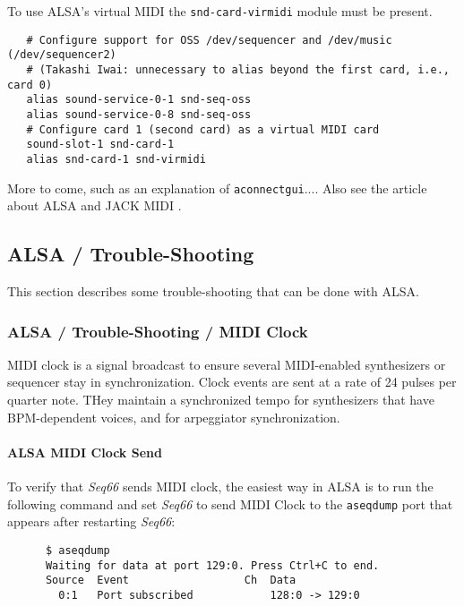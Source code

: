    To use ALSA's virtual MIDI the
   \texttt{snd-card-virmidi} module must be present. 

   \begin{verbatim}
   # Configure support for OSS /dev/sequencer and /dev/music (/dev/sequencer2)
   # (Takashi Iwai: unnecessary to alias beyond the first card, i.e., card 0)
   alias sound-service-0-1 snd-seq-oss
   alias sound-service-0-8 snd-seq-oss
   # Configure card 1 (second card) as a virtual MIDI card
   sound-slot-1 snd-card-1
   alias snd-card-1 snd-virmidi
   \end{verbatim}

   More to come, such as an explanation of \texttt{aconnectgui}....
   Also see the article about ALSA and JACK MIDI \cite{midilinux}.

\subsection{ALSA / Trouble-Shooting}
\label{subsec:alsa_testing}

   This section describes some trouble-shooting that can be done with ALSA.

\subsubsection{ALSA / Trouble-Shooting / MIDI Clock}
\label{subsubsec:alsa_testing_midi_clock}

   MIDI clock is a signal broadcast to ensure
   several MIDI-enabled synthesizers or sequencer stay in
   synchronization. Clock events are sent at a rate of 24 pulses per quarter
   note.  THey maintain a synchronized tempo for synthesizers
   that have BPM-dependent voices, and for arpeggiator synchronization.

\paragraph{ALSA MIDI Clock Send}
\label{paragraph:alsa_testing_midi_clock_send}

   To verify that \textsl{Seq66} sends MIDI clock, the easiest way in
   ALSA is to run the following command and set \textsl{Seq66} to send
   MIDI Clock to the \texttt{aseqdump} port that appears after restarting
   \textsl{Seq66}:

   \begin{verbatim}
      $ aseqdump
      Waiting for data at port 129:0. Press Ctrl+C to end.
      Source  Event                  Ch  Data
        0:1   Port subscribed            128:0 -> 129:0
   \end{verbatim}

